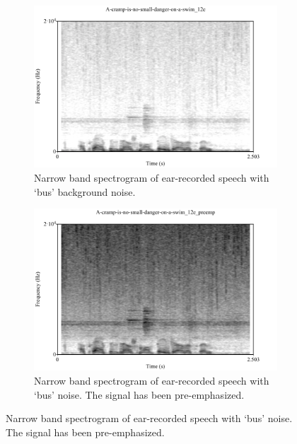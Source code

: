 \DIFaddend \begin{figure}[h!]
\centering
\begin{subfigure}{0.475\textwidth}
  \centering
  \includegraphics[width=1\linewidth]{figure/spctgrmEarNarrow20kHz.pdf}
  \caption{Narrow band spectrogram of ear-recorded speech with \DIFdelbeginFL {}\DIFdelendFL \DIFaddbeginFL {}\DIFaddendFL `bus' background noise.}
  \label{spctgrmEarNarrow20kHz}
\end{subfigure}%
\hfill
\begin{subfigure}{0.475\textwidth}
  \centering
  \includegraphics[width=1\linewidth]{figure/spctgrmNarrowEarNoisePremp.pdf}
  \caption{Narrow band spectrogram of ear-recorded speech with \DIFdelbeginFL {}\DIFdelendFL \DIFaddbeginFL {}\DIFaddendFL `bus' noise.  The signal has been pre-emphasized.}
  \label{spctgrmNarrowEarNoisePremp_35}
\end{subfigure}

\end{figure}
